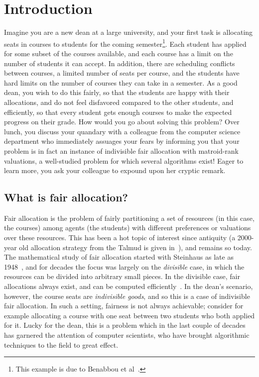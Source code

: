 \chapter{Introduction}

Imagine you are a new dean at a large university, and your first task is allocating seats in courses to students for the coming semester\footnote{This example is due to Benabbou et al~\cite{Benabbou_2020}.}. Each student has applied for some subset of the courses available, and each course has a limit on the number of students it can accept. In addition, there are scheduling conflicts between courses, a limited number of seats per course, and the students have hard limits on the number of courses they can take in a semester. As a good dean, you wish to do this fairly, so that the students are happy with their allocations, and do not feel disfavored compared to the other students, and efficiently, so that every student gets enough courses to make the expected progress on their grade. How would you go about solving this problem? Over lunch, you discuss your quandary with a colleague from the computer science department who immediately assuages your fears by informing you that your problem is in fact an instance of indivisible fair allocation with matroid-rank valuations, a well-studied problem for which several algorithms exist! Eager to learn more, you ask your colleague to expound upon her cryptic remark.

\section*{What is fair allocation?}
Fair allocation is the problem of fairly partitioning a set of resources (in this case, the courses) among agents (the students) with different preferences or valuations over these resources. This has been a hot topic of interest since antiquity (a 2000-year old allocation strategy from the Talmud is given in~\cite{aumann-1985}), and remains so today. The mathematical study of fair allocation started with Steinhaus as late as 1948~\cite{steinhaus-1948}, and for decades the focus was largely on the \textit{divisible} case, in which the resources can be divided into arbitrary small pieces. In the divisible case, fair allocations always exist, and can be computed efficiently~\cite{amanatidis2022fair}. In the dean's scenario, however, the course seats are \textit{indivisible goods}, and so this is a case of indivisible fair allocation. In such a setting, fairness is not always achievable; consider for example allocating a course with one seat between two students who both applied for it. Lucky for the dean, this is a problem which in the last couple of decades has garnered the attention of computer scientists, who have brought algorithmic techniques to the field to great effect. 

